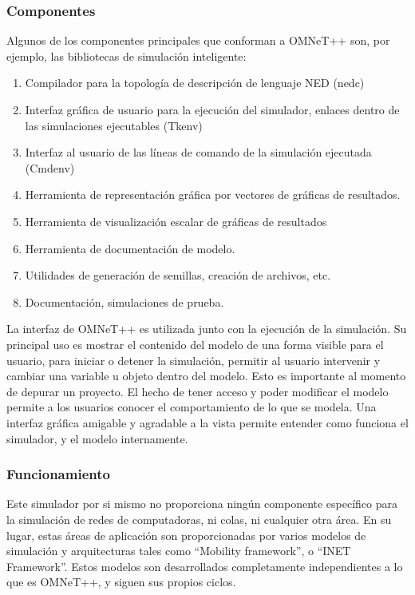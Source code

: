 \subsubsection{Componentes}

Algunos de los componentes principales que conforman a OMNeT++ son, por ejemplo, las bibliotecas de simulación inteligente:

\begin{enumerate}
    \item Compilador para la topología de descripción de lenguaje NED (nedc)
    \item Interfaz gráfica de usuario para la ejecución del simulador, enlaces dentro de las simulaciones ejecutables (Tkenv)
    \item Interfaz al usuario de las líneas de comando de la simulación ejecutada (Cmdenv)
    \item Herramienta de representación gráfica por vectores de gráficas de resultados.
    \item Herramienta de visualización escalar de gráficas de resultados
    \item Herramienta de documentación de modelo.
    \item Utilidades de generación de semillas, creación de archivos, etc.
    \item Documentación, simulaciones de prueba.
\end{enumerate}

La interfaz de OMNeT++ es utilizada junto con la ejecución de la simulación. Su principal uso es mostrar el contenido del modelo de una forma visible para el usuario, para iniciar o detener la simulación, permitir al usuario intervenir y cambiar una variable u objeto dentro del modelo. Esto es importante al momento de depurar un proyecto. El hecho de tener acceso y poder modificar el modelo permite a los usuarios conocer el comportamiento de lo que se modela. Una interfaz gráfica amigable y agradable a la vista permite entender como funciona el simulador, y el modelo internamente.

\subsubsection{Funcionamiento}

Este simulador por si mismo no proporciona ningún componente específico para la simulación de redes de computadoras, ni colas, ni cualquier otra área. En su lugar, estas áreas de aplicación son proporcionadas por varios modelos de simulación y arquitecturas tales como ``Mobility framework'', o ``INET Framework''. Estos modelos son desarrollados completamente independientes a lo que es OMNeT++, y siguen sus propios ciclos.

